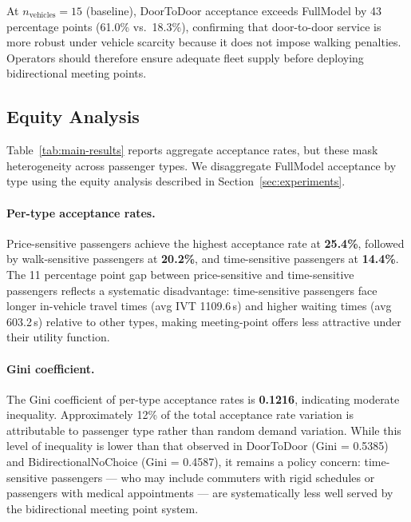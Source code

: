 At $n_{\text{vehicles}} = 15$ (baseline), DoorToDoor acceptance exceeds
FullModel by 43 percentage points (61.0\% vs.\ 18.3\%), confirming that
door-to-door service is more robust under vehicle scarcity because it does
not impose walking penalties. Operators should therefore ensure adequate
fleet supply before deploying bidirectional meeting points.

\subsection{Equity Analysis}

Table~\ref{tab:main-results} reports aggregate acceptance rates, but these
mask heterogeneity across passenger types. We disaggregate FullModel
acceptance by type using the equity analysis described in Section~\ref{sec:experiments}.

\paragraph{Per-type acceptance rates.}
Price-sensitive passengers achieve the highest acceptance rate at
\textbf{25.4\%}, followed by walk-sensitive passengers at \textbf{20.2\%},
and time-sensitive passengers at \textbf{14.4\%}. The 11 percentage point
gap between price-sensitive and time-sensitive passengers reflects a
systematic disadvantage: time-sensitive passengers face longer in-vehicle
travel times (avg IVT 1109.6\,s) and higher waiting times (avg 603.2\,s)
relative to other types, making meeting-point offers less attractive under
their utility function.

\paragraph{Gini coefficient.}
The Gini coefficient of per-type acceptance rates is \textbf{0.1216},
indicating moderate inequality. Approximately 12\% of the total acceptance
rate variation is attributable to passenger type rather than random demand
variation. While this level of inequality is lower than that observed in
DoorToDoor (Gini = 0.5385) and BidirectionalNoChoice (Gini = 0.4587), it
remains a policy concern: time-sensitive passengers --- who may include
commuters with rigid schedules or passengers with medical appointments ---
are systematically less well served by the bidirectional meeting point system.

